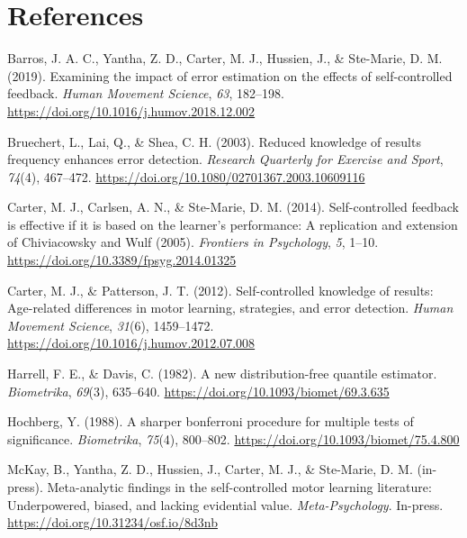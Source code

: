 \documentclass[
  man, donotrepeattitle,floatsintext]{apa7}
\newlength{\cslhangindent}
\newlength{\cslentryspacingunit} %
\newenvironment{CSLReferences}[2] %
 {%
  \setlength{\parindent}{0pt}
  \ifodd #1
  \let\oldpar\par
  \def\par{\hangindent=\cslhangindent\oldpar}
  \fi
  \setlength{\parskip}{#2\cslentryspacingunit}
 }%
 {}
\begin{document}
\newpage

\hypertarget{references}{%
\section{References}\label{references}}

\vspace{2ex}

\hypertarget{refs}{}
\begin{CSLReferences}{1}{0}
\leavevmode{}%
Barros, J. A. C., Yantha, Z. D., Carter, M. J., Hussien, J., \& Ste-Marie, D. M. (2019). Examining the impact of error estimation on the effects of self-controlled feedback. \emph{Human Movement Science}, \emph{63}, 182--198. \url{https://doi.org/10.1016/j.humov.2018.12.002}

\leavevmode{}%
Bruechert, L., Lai, Q., \& Shea, C. H. (2003). Reduced knowledge of results frequency enhances error detection. \emph{Research Quarterly for Exercise and Sport}, \emph{74}(4), 467--472. \url{https://doi.org/10.1080/02701367.2003.10609116}

\leavevmode{}%
Carter, M. J., Carlsen, A. N., \& Ste-Marie, D. M. (2014). Self-controlled feedback is effective if it is based on the learner's performance: A replication and extension of {Chiviacowsky} and {Wulf} (2005). \emph{Frontiers in Psychology}, \emph{5}, 1--10. \url{https://doi.org/10.3389/fpsyg.2014.01325}

\leavevmode{}%
Carter, M. J., \& Patterson, J. T. (2012). Self-controlled knowledge of results: {Age-related} differences in motor learning, strategies, and error detection. \emph{Human Movement Science}, \emph{31}(6), 1459--1472. \url{https://doi.org/10.1016/j.humov.2012.07.008}

\leavevmode{}%
Harrell, F. E., \& Davis, C. (1982). A new distribution-free quantile estimator. \emph{Biometrika}, \emph{69}(3), 635--640. \url{https://doi.org/10.1093/biomet/69.3.635}

\leavevmode{}%
Hochberg, Y. (1988). A sharper bonferroni procedure for multiple tests of significance. \emph{Biometrika}, \emph{75}(4), 800--802. \url{https://doi.org/10.1093/biomet/75.4.800}

\leavevmode{}%
McKay, B., Yantha, Z. D., Hussien, J., Carter, M. J., \& Ste-Marie, D. M. (in-press). Meta-analytic findings in the self-controlled motor learning literature: {Underpowered}, biased, and lacking evidential value. \emph{Meta-Psychology}. In-press. \url{https://doi.org/10.31234/osf.io/8d3nb}


\end{CSLReferences}
\end{document}
